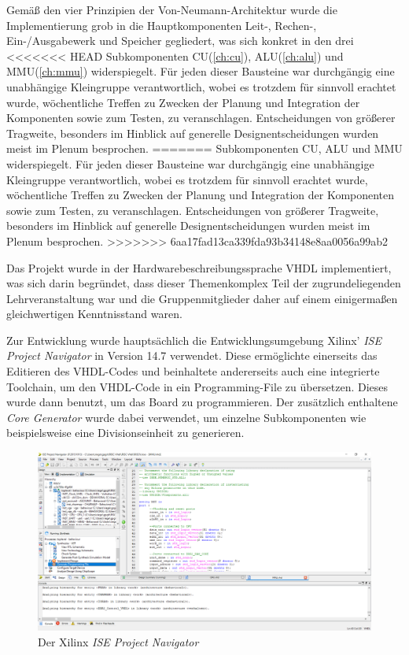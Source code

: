Gem\"a\ss{} den vier Prinzipien der Von-Neumann-Architektur wurde die
Implementierung grob in die Hauptkomponenten Leit-, Rechen-,
Ein-/Ausgabewerk und Speicher gegliedert, was sich konkret in den drei
<<<<<<< HEAD
Subkomponenten CU(\ref{ch:cu}), ALU(\ref{ch:alu}) und MMU(\ref{ch:mmu})
widerspiegelt. F\"ur jeden dieser Bausteine war durchg\"angig eine
unabh\"angige Kleingruppe verantwortlich, wobei es trotzdem f\"ur sinnvoll
erachtet wurde, w\"ochentliche Treffen zu Zwecken der Planung und Integration
der Komponenten sowie zum Testen, zu veranschlagen. Entscheidungen von
gr\"o\ss{}erer Tragweite, besonders im Hinblick auf generelle
Designentscheidungen wurden meist im Plenum besprochen.
=======
Subkomponenten CU, ALU und MMU widerspiegelt. F\"ur jeden dieser Bausteine
war durchg\"angig eine unabh\"angige Kleingruppe verantwortlich, wobei es
trotzdem f\"ur sinnvoll erachtet wurde, w\"ochentliche Treffen zu Zwecken der
Planung und Integration der Komponenten sowie zum Testen, zu veranschlagen.
Entscheidungen von gr\"o\ss{}erer Tragweite, besonders im Hinblick auf
generelle Designentscheidungen wurden meist im Plenum besprochen.
>>>>>>> 6aa17fad13ca339fda93b34148e8aa0056a99ab2

Das Projekt wurde in der Hardwarebeschreibungssprache VHDL implementiert, was
sich darin begr\"undet, dass dieser Themenkomplex Teil der zugrundeliegenden
Lehrveranstaltung war und die Gruppenmitglieder daher auf einem
einigerma\ss{}en gleichwertigen Kenntnisstand waren.

Zur Entwicklung wurde haupts\"achlich die Entwicklungsumgebung Xilinx'
\textit{ISE Project Navigator} in Version 14.7 verwendet. Diese erm\"oglichte
einerseits das Editieren des VHDL-Codes und beinhaltete andererseits auch eine
integrierte Toolchain, um den VHDL-Code in ein Programming-File zu
\"ubersetzen. Dieses wurde dann benutzt, um das Board zu programmieren. Der
zus\"atzlich enthaltene \textit{Core Generator} wurde dabei verwendet, um
einzelne Subkomponenten wie beispielsweise eine Divisionseinheit zu generieren.

\begin{figure}[H]
\centering
\label{fig:tool}
\includegraphics[width=1.0\textwidth]{ISE.png}
\caption{Der Xilinx \textit{ISE Project Navigator}}
\end{figure}

